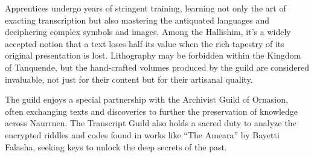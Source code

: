 \documentclass[11pt]{article}
\begin{document}
\begin{enumerate}
\begin{enumerate}
Apprentices undergo years of stringent training, learning not only the art of exacting transcription but also mastering the antiquated languages and deciphering complex symbols and images. Among the Hallishim, it's a widely accepted notion that a text loses half its value when the rich tapestry of its original presentation is lost. Lithography may be forbidden within the Kingdom of Tanquende, but the hand-crafted volumes produced by the guild are considered invaluable, not just for their content but for their artisanal quality.

The guild enjoys a special partnership with the Archivist Guild of Ornasion, often exchanging texts and discoveries to further the preservation of knowledge across Naurrnen. The Transcript Guild also holds a sacred duty to analyze the encrypted riddles and codes found in works like ``The Ameara'' by Bayetti Falasha, seeking keys to unlock the deep secrets of the past.


\end{enumerate}
\end{enumerate}
\end{document}
